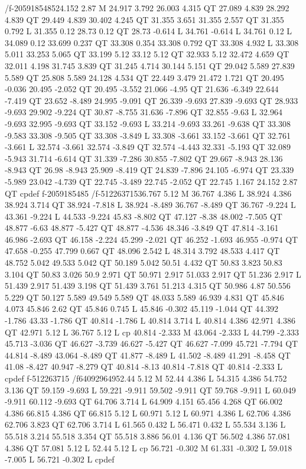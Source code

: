 /f-2059185485{24.152 2.87 M
24.917 3.792 26.003 4.315 QT
27.089 4.839 28.292 4.839 QT
29.449 4.839 30.402 4.245 QT
31.355 3.651 31.355 2.557 QT
31.355 0.792 L
31.355 0.12 28.73 0.12 QT
28.73 -0.614 L
34.761 -0.614 L
34.761 0.12 L
34.089 0.12 33.699 0.237 QT
33.308 0.354 33.308 0.792 QT
33.308 4.932 L
33.308 5.011 33.253 5.065 QT
33.199 5.12 33.12 5.12 QT
32.933 5.12 32.472 4.659 QT
32.011 4.198 31.745 3.839 QT
31.245 4.714 30.144 5.151 QT
29.042 5.589 27.839 5.589 QT
25.808 5.589 24.128 4.534 QT
22.449 3.479 21.472 1.721 QT
20.495 -0.036 20.495 -2.052 QT
20.495 -3.552 21.066 -4.95 QT
21.636 -6.349 22.644 -7.419 QT
23.652 -8.489 24.995 -9.091 QT
26.339 -9.693 27.839 -9.693 QT
28.933 -9.693 29.902 -9.224 QT
30.87 -8.755 31.636 -7.896 QT
32.855 -9.63 L
32.964 -9.693 32.995 -9.693 QT
33.152 -9.693 L
33.214 -9.693 33.261 -9.638 QT
33.308 -9.583 33.308 -9.505 QT
33.308 -3.849 L
33.308 -3.661 33.152 -3.661 QT
32.761 -3.661 L
32.574 -3.661 32.574 -3.849 QT
32.574 -4.443 32.331 -5.193 QT
32.089 -5.943 31.714 -6.614 QT
31.339 -7.286 30.855 -7.802 QT
29.667 -8.943 28.136 -8.943 QT
26.98 -8.943 25.909 -8.419 QT
24.839 -7.896 24.105 -6.974 QT
23.339 -5.989 23.042 -4.739 QT
22.745 -3.489 22.745 -2.052 QT
22.745 1.167 24.152 2.87 QT
cp}def
f-2059185485
/f-512263715{36.767 5.12 M
36.767 4.386 L
38.924 4.386 38.924 3.714 QT
38.924 -7.818 L
38.924 -8.489 36.767 -8.489 QT
36.767 -9.224 L
43.361 -9.224 L
44.533 -9.224 45.83 -8.802 QT
47.127 -8.38 48.002 -7.505 QT
48.877 -6.63 48.877 -5.427 QT
48.877 -4.536 48.346 -3.849 QT
47.814 -3.161 46.986 -2.693 QT
46.158 -2.224 45.299 -2.021 QT
46.252 -1.693 46.955 -0.974 QT
47.658 -0.255 47.799 0.667 QT
48.096 2.542 L
48.314 3.792 48.533 4.417 QT
48.752 5.042 49.533 5.042 QT
50.189 5.042 50.51 4.432 QT
50.83 3.823 50.83 3.104 QT
50.83 3.026 50.9 2.971 QT
50.971 2.917 51.033 2.917 QT
51.236 2.917 L
51.439 2.917 51.439 3.198 QT
51.439 3.761 51.213 4.315 QT
50.986 4.87 50.556 5.229 QT
50.127 5.589 49.549 5.589 QT
48.033 5.589 46.939 4.831 QT
45.846 4.073 45.846 2.62 QT
45.846 0.745 L
45.846 -0.302 45.119 -1.044 QT
44.392 -1.786 43.33 -1.786 QT
40.814 -1.786 L
40.814 3.714 L
40.814 4.386 42.971 4.386 QT
42.971 5.12 L
36.767 5.12 L
cp
40.814 -2.333 M
43.064 -2.333 L
44.799 -2.333 45.713 -3.036 QT
46.627 -3.739 46.627 -5.427 QT
46.627 -7.099 45.721 -7.794 QT
44.814 -8.489 43.064 -8.489 QT
41.877 -8.489 L
41.502 -8.489 41.291 -8.458 QT
41.08 -8.427 40.947 -8.279 QT
40.814 -8.13 40.814 -7.818 QT
40.814 -2.333 L
cp}def
f-512263715
/f640929649{52.44 5.12 M
52.44 4.386 L
54.315 4.386 54.752 3.136 QT
59.159 -9.693 L
59.221 -9.911 59.502 -9.911 QT
59.768 -9.911 L
60.049 -9.911 60.112 -9.693 QT
64.706 3.714 L
64.909 4.151 65.456 4.268 QT
66.002 4.386 66.815 4.386 QT
66.815 5.12 L
60.971 5.12 L
60.971 4.386 L
62.706 4.386 62.706 3.823 QT
62.706 3.714 L
61.565 0.432 L
56.471 0.432 L
55.534 3.136 L
55.518 3.214 55.518 3.354 QT
55.518 3.886 56.01 4.136 QT
56.502 4.386 57.081 4.386 QT
57.081 5.12 L
52.44 5.12 L
cp
56.721 -0.302 M
61.331 -0.302 L
59.018 -7.005 L
56.721 -0.302 L
cp}def
